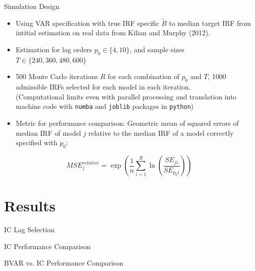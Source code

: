 \documentclass[aspectratio=169]{beamer}
\begin{document}
\begin{frame}{Simulation Design}
  \begin{itemize}
    \item Using VAR specification with true IRF specific $\tilde{B}$ to median target IRF from intitial estimation on real data from Kilian and Murphy (2012).
    \item Estimation for lag orders $p_0 \in \{4,10\}$, and sample sizes $T \in \{240, 360, 480, 600\}$
    \item 500 Monte Carlo iterations $R$ for each combination of $p_0$ and $T$, 1000 admissible IRFs selected for each model in each iteration. \\
    (Computational limits even with parallel processing and translation into machine code with \texttt{numba} and \texttt{joblib} packages in \texttt{python})
    \item Metric for performance comparison: Geometric mean of squared errors of median IRF of model $j$ relative to the median IRF of a model correctly specified with $p_0$:
  \end{itemize}
\begin{equation}
    MSE^{relative}_j = \exp\left( \frac{1}{n} \sum_{i=1}^{R} \ln(\frac{SE_{ji}}{SE_{p_0i}}) \right)
\end{equation}
\end{frame}

\section{Results}

\begin{frame}{IC Lag Selection}
  
\end{frame}

\begin{frame}{IC Performance Comparison}
  
\end{frame}

\begin{frame}{BVAR vs. IC Performance Comparison}
  
\end{frame}
\end{document}

